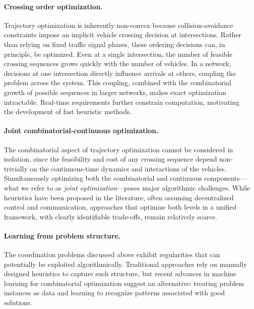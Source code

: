 \documentclass[a4paper]{report}
\theoremstyle{definition}
\theoremstyle{plain}
\begin{document}
\paragraph{Crossing order optimization.}

Trajectory optimization is inherently non-convex because collision-avoidance
constraints impose an implicit vehicle crossing decision at intersections.
Rather than relying on fixed traffic signal phases, these ordering decisions
can, in principle, be optimized.
%
Even at a single intersection, the number of feasible crossing sequences grows
quickly with the number of vehicles. In a network, decisions at one intersection
directly influence arrivals at others, coupling the problem across the system.
This coupling, combined with the combinatorial growth of possible sequences
in larger networks, makes exact optimization intractable. Real-time requirements
further constrain computation, motivating the development of fast heuristic
methods.

\paragraph{Joint combinatorial-continuous optimization.}

The combinatorial aspect of trajectory optimization cannot be considered in
isolation, since the feasibility and cost of any crossing sequence depend
non-trivially on the continuous-time dynamics and interactions of the vehicles.
Simultaneously optimizing both the combinatorial and continuous
components---what we refer to as \emph{joint optimization}---poses major
algorithmic challenges. While heuristics have been proposed in the literature,
often assuming decentralized control and communication, approaches that optimize
both levels in a unified framework, with clearly identifiable trade-offs, remain
relatively scarce.

\paragraph{Learning from problem structure.}

The coordination problems discussed above exhibit regularities that can potentially be exploited algorithmically. Traditional approaches rely on manually designed heuristics to capture such structure, but recent advances in machine learning for combinatorial optimization suggest an alternative: treating problem instances as data and learning to recognize patterns associated with good solutions.
\end{document}
